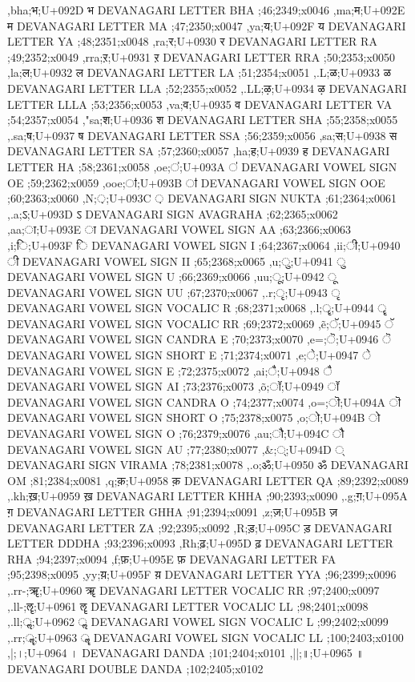 \documentclass{article}
\begin{document}
{,bha;भ;U+092D भ DEVANAGARI LETTER BHA ;46;2349;x0046
,ma;म;U+092E म DEVANAGARI LETTER MA ;47;2350;x0047
,ya;य;U+092F य DEVANAGARI LETTER YA ;48;2351;x0048
,ra;र;U+0930 र DEVANAGARI LETTER RA ;49;2352;x0049
,rra;ऱ;U+0931 ऱ DEVANAGARI LETTER RRA ;50;2353;x0050
,la;ल;U+0932 ल DEVANAGARI LETTER LA ;51;2354;x0051
,.L;ळ;U+0933 ळ DEVANAGARI LETTER LLA ;52;2355;x0052
,.LL;ऴ;U+0934 ऴ DEVANAGARI LETTER LLLA ;53;2356;x0053
,va;व;U+0935 व DEVANAGARI LETTER VA ;54;2357;x0054
,"sa;श;U+0936 श DEVANAGARI LETTER SHA ;55;2358;x0055
,.sa;ष;U+0937 ष DEVANAGARI LETTER SSA ;56;2359;x0056
,sa;स;U+0938 स DEVANAGARI LETTER SA ;57;2360;x0057
,ha;ह;U+0939 ह DEVANAGARI LETTER HA ;58;2361;x0058
,oe;ऺ;U+093A ऺ DEVANAGARI VOWEL SIGN OE ;59;2362;x0059
,ooe;ऻ;U+093B ऻ DEVANAGARI VOWEL SIGN OOE ;60;2363;x0060
,N;़;U+093C ़ DEVANAGARI SIGN NUKTA ;61;2364;x0061
,.a;ऽ;U+093D ऽ DEVANAGARI SIGN AVAGRAHA ;62;2365;x0062
,aa;ा;U+093E ा DEVANAGARI VOWEL SIGN AA ;63;2366;x0063
,i;ि;U+093F ि DEVANAGARI VOWEL SIGN I ;64;2367;x0064
,ii;ी;U+0940 ी DEVANAGARI VOWEL SIGN II ;65;2368;x0065
,u;ु;U+0941 ु DEVANAGARI VOWEL SIGN U ;66;2369;x0066
,uu;ू;U+0942 ू DEVANAGARI VOWEL SIGN UU ;67;2370;x0067
,.r;ृ;U+0943 ृ DEVANAGARI VOWEL SIGN VOCALIC R ;68;2371;x0068
,.l;ॄ;U+0944 ॄ DEVANAGARI VOWEL SIGN VOCALIC RR ;69;2372;x0069
,\~e;ॅ;U+0945 ॅ DEVANAGARI VOWEL SIGN CANDRA E ;70;2373;x0070
,e=;ॆ;U+0946 ॆ DEVANAGARI VOWEL SIGN SHORT E ;71;2374;x0071
,e;े;U+0947 े DEVANAGARI VOWEL SIGN E ;72;2375;x0072
,ai;ै;U+0948 ै DEVANAGARI VOWEL SIGN AI ;73;2376;x0073
,\~o;ॉ;U+0949 ॉ DEVANAGARI VOWEL SIGN CANDRA O ;74;2377;x0074
,o=;ॊ;U+094A ॊ DEVANAGARI VOWEL SIGN SHORT O ;75;2378;x0075
,o;ो;U+094B ो DEVANAGARI VOWEL SIGN O ;76;2379;x0076
,au;ौ;U+094C ौ DEVANAGARI VOWEL SIGN AU ;77;2380;x0077
,\&;्;U+094D ् DEVANAGARI SIGN VIRAMA ;78;2381;x0078
%  
%  
,.o;ॐ;U+0950 ॐ DEVANAGARI OM ;81;2384;x0081
%  
%  
%  
%  
%  
%  
%  
,q;क़;U+0958 क़ DEVANAGARI LETTER QA ;89;2392;x0089
,.kh;ख़;U+0959 ख़ DEVANAGARI LETTER KHHA ;90;2393;x0090
,.g;ग़;U+095A ग़ DEVANAGARI LETTER GHHA ;91;2394;x0091
,z;ज़;U+095B ज़ DEVANAGARI LETTER ZA ;92;2395;x0092
,R;ड़;U+095C ड़ DEVANAGARI LETTER DDDHA ;93;2396;x0093
,Rh;ढ़;U+095D ढ़ DEVANAGARI LETTER RHA ;94;2397;x0094
,f;फ़;U+095E फ़ DEVANAGARI LETTER FA ;95;2398;x0095
,yy;य़;U+095F य़ DEVANAGARI LETTER YYA ;96;2399;x0096
,.rr-;ॠ;U+0960 ॠ DEVANAGARI LETTER VOCALIC RR ;97;2400;x0097
,.ll-;ॡ;U+0961 ॡ DEVANAGARI LETTER VOCALIC LL ;98;2401;x0098
,.ll;ॢ;U+0962 ॢ DEVANAGARI VOWEL SIGN VOCALIC L ;99;2402;x0099
,.rr;ॣ;U+0963 ॣ DEVANAGARI VOWEL SIGN VOCALIC LL ;100;2403;x0100
,|;।;U+0964 । DEVANAGARI DANDA ;101;2404;x0101
,||;॥;U+0965 ॥ DEVANAGARI DOUBLE DANDA ;102;2405;x0102
}
\end{document}
